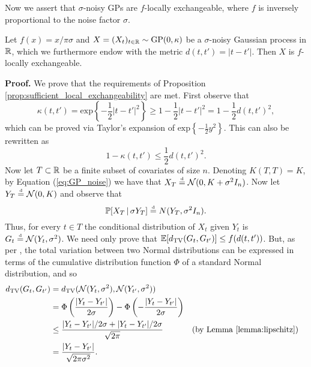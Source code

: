 Now we assert that $\sigma$-noisy GPs are $f$-locally exchangeable, where $f$ is inversely proportional to the noise factor $\sigma$. 

\begin{proposition} \label{prop:GP_local_exchangeability}
	Let $f(x) = x / \pi \sigma$ and $X = (X_t)_{t \in \mathbb{R}} \sim \mathrm{GP} (0, \kappa)$ be a $\sigma$-noisy Gaussian process in $\mathbb{R}$, which we furthermore endow with the metric  $d(t, t') = |t-t'|$. Then $X$ is $f$-locally exchangeable.
\end{proposition}



\textbf{Proof. \hspace{0.05cm}} We prove that the requirements of Proposition \ref{prop:sufficient_local_exchangeability} are met. First observe that
\begin{equation*}
	\kappa(t, t') = \mathrm{exp} \left\{ -\frac{1}{2} |t - t'|^2 \right\} \geq 1 - \frac{1}{2} |t-t'|^2 = 1 - \frac{1}{2} d(t, t')^2,
\end{equation*}
which can be proved via Taylor's expansion of $\mathrm{exp} \left\{ -\frac{1}{2} y^2 \right\}$. This can also be rewritten as
\begin{equation} \label{eq:kappa_bound}
	1 - \kappa(t, t') \leq \frac{1}{2} d(t, t')^2.
\end{equation}
Now let $T \subset \mathbb{R}$ be a finite subset of covariates of size $n$. Denoting $K(T, T) = K$, by Equation (\ref{eq:GP_noise}) we have that $X_T \stackrel{\text{\rm\tiny d}}{=} \mathcal{N} (0, K + \sigma^2 I_n )$. Now let $Y_T \stackrel{\text{\rm\tiny d}}{=} \mathcal{N}(0, K)$ and observe that
\begin{equation}
	\mathbb{P} [X_T \, | \, \sigma Y_T ] \stackrel{\text{\rm\tiny d}}{=} N(Y_T, \sigma^2 I_n).
\end{equation}
Thus, for every $t \in T$ the conditional distribution of $X_t$ given $Y_t$ is $G_t \stackrel{\text{\rm\tiny d}}{=} \mathcal{N} (Y_t, \sigma^2)$. We need only prove that $\mathbb{E}[d_{\mathrm{TV}} (G_t , G_{t'} ) ] \leq f(d(t, t'))$. But, as per \cite[][p.~15]{CampbellEtAl:2019:LocalExch}, the total variation between two Normal distributions can be expressed in terms of the cumulative distribution function $\Phi$ of a standard Normal distribution, and so
\begin{align}
	d_{\mathrm{TV}} (G_t , G_{t'} )  &= d_{\mathrm{TV}} (\mathcal{N} (Y_t, \sigma^2) , \mathcal{N} (Y_{t'}, \sigma^2) )   \nonumber \\
		&= \Phi \left( \frac{|Y_t - Y_{t'} |}{2 \sigma} \right) - \Phi \left( -\frac{|Y_t - Y_{t'} |}{2 \sigma} \right) \nonumber \\
		&\leq \frac{|Y_t - Y_{t'} |/2\sigma + |Y_t - Y_{t'} |/2\sigma}{\sqrt{2\pi}} && \text{(by Lemma \ref{lemma:lipschitz})} \nonumber \\
		&= \frac{|Y_t - Y_{t'}|}{\sqrt{2 \pi \sigma^2}}. \label{eq:TV_GP}
\end{align}
